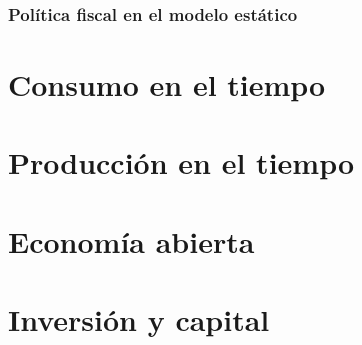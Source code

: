 \documentclass[8pt,a4paper]{extarticle}
\begin{document}
\begin{multicols}{3}
\sectionbreak

\section{Política fiscal en el modelo estático}



\newpage

\part{Consumo en el tiempo}

\newpage

\part{Producción en el tiempo}

\newpage

\part{Economía abierta}

\newpage

\part{Inversión y capital}

\vfill\eject
\columnbreak
\end{multicols}
\end{document}
